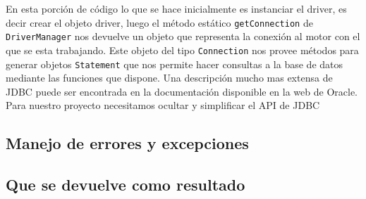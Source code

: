En esta porción de código lo que se hace inicialmente es instanciar el driver, es decir crear el objeto driver, luego el método estático \verb=getConnection= de 	\verb=DriverManager= nos devuelve un objeto que representa la conexión al motor con el que se esta trabajando. Este objeto del tipo \verb=Connection= nos provee métodos para generar objetos \verb=Statement= que nos permite hacer consultas a la base de datos mediante las funciones que dispone. Una descripción mucho mas extensa de JDBC puede ser encontrada en la documentación disponible en la web de Oracle\citep{java:jdbc}.
Para nuestro proyecto necesitamos ocultar y simplificar el API de JDBC
\subsection{Manejo de errores y excepciones}

\subsection{Que se devuelve como resultado}
